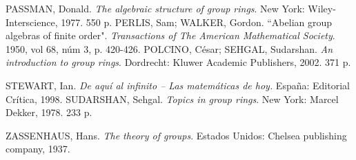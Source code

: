 \begin{thebibliography}{99}
     PASSMAN, Donald. \textit{The algebraic structure of group rings}. New York: Wiley-Interscience, 1977. 550 p.
     PERLIS, Sam; WALKER, Gordon. ``Abelian group algebras of finite order". \textit{Transactions of The American Mathematical Society}. 1950, vol 68, núm 3, p. 420-426.
     POLCINO, César; SEHGAL, Sudarshan. \textit{An introduction to group rings}.  Dordrecht: Kluwer Academic Publishers, 2002. 371 p.
    
     STEWART, Ian. \textit{De aquí al infinito -- Las matemáticas de hoy.} España: Editorial Crítica, 1998.
     SUDARSHAN, Sehgal.  \textit{Topics in group rings}. New York: Marcel Dekker, 1978. 233 p. 
    
    
    
	 ZASSENHAUS, Hans. \textit{The theory of groups}. Estados Unidos: Chelsea publishing company, 1937.
	
		
		
\end{thebibliography}
